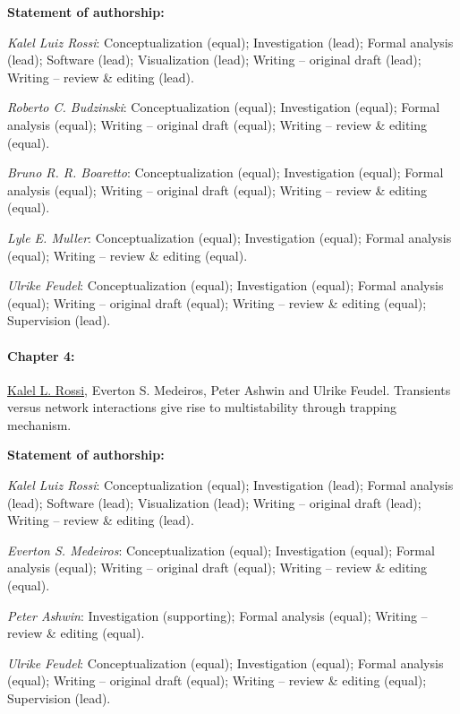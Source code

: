 {\vspace{0.3cm}\footnotesize \textbf{Statement of authorship:} %

\textit{Kalel Luiz Rossi}: Conceptualization (equal); Investigation (lead); Formal analysis (lead); Software (lead); Visualization (lead); Writing – original draft (lead); Writing – review \& editing (lead). 

\textit{Roberto C. Budzinski}: Conceptualization (equal); Investigation (equal); Formal analysis (equal); Writing – original draft (equal); Writing – review \& editing (equal).

\textit{Bruno R. R. Boaretto}: Conceptualization (equal); Investigation (equal); Formal analysis (equal);  Writing – original draft (equal); Writing – review \& editing (equal).

\textit{Lyle E. Muller}: Conceptualization (equal); Investigation (equal); Formal analysis (equal); Writing – review \& editing (equal).

\textit{Ulrike Feudel}: Conceptualization (equal); Investigation (equal); Formal analysis (equal); Writing – original draft (equal); Writing – review \& editing (equal); Supervision (lead).
}

\paragraph{Chapter 4:}
\underline{Kalel L. Rossi}, Everton S. Medeiros, Peter Ashwin and Ulrike Feudel. Transients versus network interactions give rise to multistability through trapping mechanism.

{\vspace{0.3cm}\footnotesize \textbf{Statement of authorship:} %

\textit{Kalel Luiz Rossi}: Conceptualization (equal); Investigation (lead); Formal analysis (lead); Software (lead); Visualization (lead); Writing – original draft (lead); Writing – review \& editing (lead). 

\textit{Everton S. Medeiros}: Conceptualization (equal); Investigation (equal); Formal analysis (equal); Writing – original draft (equal); Writing – review \& editing (equal).

\textit{Peter Ashwin}: Investigation (supporting); Formal analysis (equal); Writing – review \& editing (equal).

\textit{Ulrike Feudel}: Conceptualization (equal); Investigation (equal); Formal analysis (equal); Writing – original draft (equal); Writing – review \& editing (equal); Supervision (lead).
}

